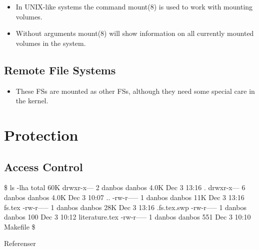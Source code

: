 \documentclass{beamer}
\begin{document}
\begin{frame}{\insertsubsectionhead}
  \begin{itemize}
    \item In UNIX-like systems the command mount(8) is used to work with 
      mounting volumes.

    \item Without arguments mount(8) will show information on all currently 
      mounted volumes in the system.

  \end{itemize}
\end{frame}

\subsection{Remote File Systems}

\begin{frame}{\insertsubsectionhead}
  \begin{itemize}
    \item These FSs are mounted as other FSs, although they need some special 
      care in the kernel.
  \end{itemize}
\end{frame}


\section{Protection}

\subsection{Access Control}

\begin{frame}[fragile]{\insertsubsectionhead}
  \begin{terminal}[basicstyle=\tiny\tt,numberstyle=\tiny]
\$ ls -lha
total 60K
drwxr-x--- 2 danbos danbos 4.0K Dec  3 13:16 .
drwxr-x--- 6 danbos danbos 4.0K Dec  3 10:07 ..
-rw-r----- 1 danbos danbos  11K Dec  3 13:16 fs.tex
-rw-r----- 1 danbos danbos  28K Dec  3 13:16 .fs.tex.swp
-rw-r----- 1 danbos danbos  100 Dec  3 10:12 literature.tex
-rw-r----- 1 danbos danbos  551 Dec  3 10:10 Makefile
\$
  \end{terminal}
\end{frame}



\begin{frame}[allowframebreaks]{Referenser}
  \small
  \printbibliography
\end{frame}
\end{document}
